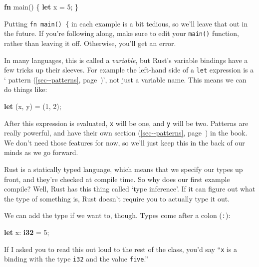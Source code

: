 \documentclass[a4paper,]{book}
\renewcommand*{\hyperref}[2][\ar]{%
  \def\ar{#2}%
  #2 (\autoref{#1}, page~\pageref{#1})}
\newenvironment{Shaded}{\begin{snugshade}}{\end{snugshade}}
\newcommand{\KeywordTok}[1]{\textcolor[rgb]{0.13,0.29,0.53}{\textbf{{#1}}}}
\newcommand{\DecValTok}[1]{\textcolor[rgb]{0.00,0.00,0.81}{{#1}}}
\newcommand{\NormalTok}[1]{{#1}}
\begin{document}
\begin{Shaded}
\begin{Highlighting}[]
\KeywordTok{fn} \NormalTok{main() \{}
    \KeywordTok{let} \NormalTok{x = }\DecValTok{5}\NormalTok{;}
\NormalTok{\}}
\end{Highlighting}
\end{Shaded}

Putting \texttt{fn\ main()\ \{} in each example is a bit tedious, so
we'll leave that out in the future. If you're following along, make sure
to edit your \texttt{main()} function, rather than leaving it off.
Otherwise, you'll get an error.

In many languages, this is called a \emph{variable}, but Rust's variable
bindings have a few tricks up their sleeves. For example the left-hand
side of a \texttt{let} expression is a
`\hyperref[sec--patterns]{pattern}', not just a variable name. This
means we can do things like:

\begin{Shaded}
\begin{Highlighting}[]
\KeywordTok{let} \NormalTok{(x, y) = (}\DecValTok{1}\NormalTok{, }\DecValTok{2}\NormalTok{);}
\end{Highlighting}
\end{Shaded}

After this expression is evaluated, \texttt{x} will be one, and
\texttt{y} will be two. Patterns are really powerful, and have
\hyperref[sec--patterns]{their own section} in the book. We don't need
those features for now, so we'll just keep this in the back of our minds
as we go forward.

Rust is a statically typed language, which means that we specify our
types up front, and they're checked at compile time. So why does our
first example compile? Well, Rust has this thing called `type
inference'. If it can figure out what the type of something is, Rust
doesn't require you to actually type it out.

We can add the type if we want to, though. Types come after a colon
(\texttt{:}):

\begin{Shaded}
\begin{Highlighting}[]
\KeywordTok{let} \NormalTok{x: }\KeywordTok{i32} \NormalTok{= }\DecValTok{5}\NormalTok{;}
\end{Highlighting}
\end{Shaded}

If I asked you to read this out loud to the rest of the class, you'd say
``\texttt{x} is a binding with the type \texttt{i32} and the value
\texttt{five}.''
\end{document}
